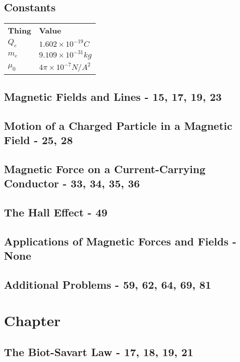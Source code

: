\documentclass[12pt, letterpaper, twoside]{article}
\begin{document}
  \subsection*{Constants}
    \begin{tabular}{l l}
      \textbf{Thing} & \textbf{Value}\\
      $Q_e$ & $1.602 \times 10^{-19}C$\\
      $m_e$ & $9.109 \times 10^{-31}kg$\\
      $\mu_0$ & $4 \pi \times 10^{-7}N/A^ 2$
    
    \end{tabular}
  
  \setcounter{subsection}{1}
  \subsection{Magnetic Fields and Lines - 15, 17, 19, 23}
  
  
  \subsection{Motion of a Charged Particle in a Magnetic Field - 25, 28}
  
  
  \subsection{Magnetic Force on a Current-Carrying Conductor - 33, 34, 35, 36}
  
  
  \subsection{The Hall Effect - 49}
  
  
  \subsection{Applications of Magnetic Forces and Fields - None}
  
  
  \subsection{Additional Problems - 59, 62, 64, 69, 81}
    
\section{Chapter }

  \subsection{The Biot-Savart Law - 17, 18, 19, 21}
  
\end{document}
